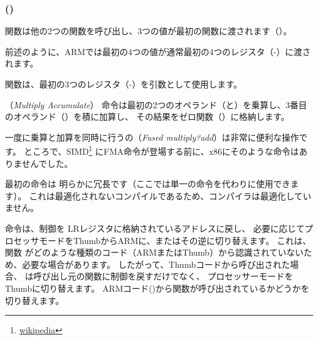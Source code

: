 \subsubsection{\NonOptimizingKeilVI (\ARMMode)}



\main 関数は他の2つの関数を呼び出し、3つの値が最初の関数に渡されます（\ttf）。

前述のように、ARMでは最初の4つの値が通常最初の4つのレジスタ（-）に渡されます。

\ttf 関数は、最初の3つのレジスタ（-）を引数として使用します。

（\emph{Multiply Accumulate}）
命令は最初の2つのオペランド（と）を乗算し、3番目のオペランド（）を積に加算し、
その結果をゼロ関数（）に格納します。

一度に乗算と加算を同時に行うの（\emph{Fused multiply?add}）は非常に便利な操作です。
ところで、SIMD\footnote{\href{http://go.yurichev.com/17103}{wikipedia}}
にFMA命令が登場する前に、x86にそのような命令はありませんでした。

最初の命令は
明らかに冗長です（ここでは単一の命令を代わりに使用できます）。
これは最適化されないコンパイルであるため、コンパイラは最適化していません。


命令は、制御を \ac{LR}レジスタに格納されているアドレスに戻し、
必要に応じてプロセッサモードをThumbからARMに、またはその逆に切り替えます。
これは、関数 \ttf がどのような種類のコード（ARMまたはThumb）から認識されていないため、必要な場合があります。
したがって、Thumbコードから呼び出された場合、
は呼び出し元の関数に制御を戻すだけでなく、
プロセッサーモードをThumbに切り替えます。 
ARMコード()から関数が呼び出されているかどうかを切り替えます。
